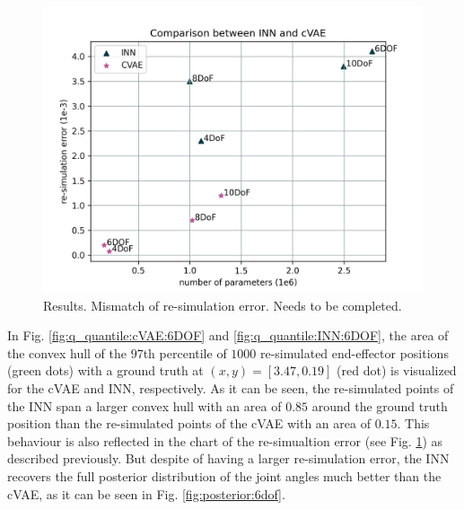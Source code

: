 \documentclass[conference]{IEEEtran}
\begin{document}
\begin{figure}[!ht]
\centering
	\includegraphics[width=\linewidth]{figures/comparison_e_resim_alternative.png}
    \caption{\label{fig:plot:resim} Results. Mismatch of re-simulation error. Needs to be completed.}
\end{figure}

In Fig. \ref{fig:q_quantile:cVAE:6DOF} and \ref{fig:q_quantile:INN:6DOF}, the area of the convex hull of the $97$th percentile of $1000$ re-simulated end-effector positions (green dots) with a ground truth at $(x, y) = [3.47, 0.19]$ (red dot) is visualized for the cVAE and INN, respectively.  As it can be seen, the re-simulated points of the INN span a larger convex hull with an area of $0.85$ around the ground truth position than the re-simulated points of the cVAE with an area of $0.15$. This behaviour is also reflected in the chart of the re-simualtion error (see Fig. \ref{fig:plot:resim}) as described previously. But despite of having a larger re-simulation error, the INN recovers the full posterior distribution of the joint angles much better than the cVAE, as it can be seen in Fig. \ref{fig:posterior:6dof}. 
\end{document}
